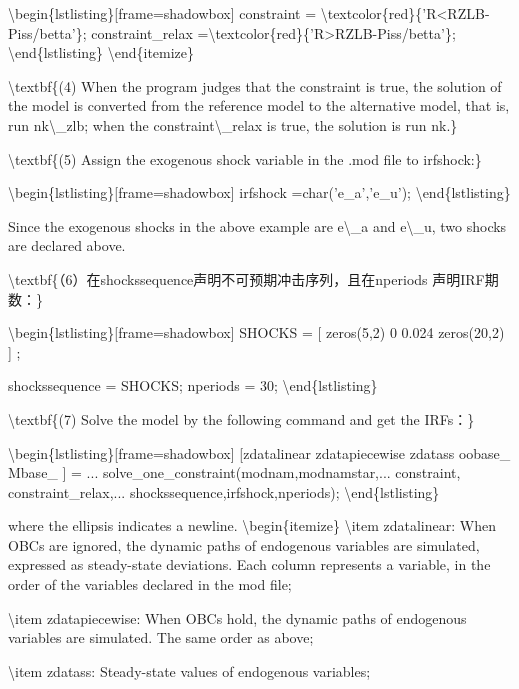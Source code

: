 \documentclass[10pt,math=newtx,citestyle=gb7714-2015,bibstyle=gb7714-2015]{elegantbook}
\begin{document}
	\textbackslash{}begin\{lstlisting\}[frame=shadowbox]
	constraint = \textbackslash{}textcolor\{red\}\{'R<RZLB-Piss/betta'\};
	constraint\_relax =\textbackslash{}textcolor\{red\}\{'R>RZLB-Piss/betta'\};
	\textbackslash{}end\{lstlisting\}
	\textbackslash{}end\{itemize\}
	
	\textbackslash{}textbf\{(4) When the program judges that the constraint is true, the solution of the model is converted from the reference model to the alternative model, that is, run nk\textbackslash{}\_zlb; when the constraint\textbackslash{}\_relax is true, the solution is run nk.\}
	
	\textbackslash{}textbf\{(5) Assign the exogenous shock variable in the .mod file to irfshock:\}
	
	\textbackslash{}begin\{lstlisting\}[frame=shadowbox]
	irfshock =char('e\_a','e\_u');
	\textbackslash{}end\{lstlisting\}
	
	Since the exogenous shocks in the above example are e\textbackslash{}\_a and e\textbackslash{}\_u, two shocks are declared above.
	
	\textbackslash{}textbf\{（6）在shockssequence声明不可预期冲击序列，且在nperiods 声明IRF期数：\}
	
	\textbackslash{}begin\{lstlisting\}[frame=shadowbox]
	SHOCKS = [ zeros(5,2)
	0  0.024
	zeros(20,2) ] ;
	
	
	shockssequence = SHOCKS;
	nperiods = 30;
	\textbackslash{}end\{lstlisting\}
	
	\textbackslash{}textbf\{(7) Solve the model by the following command and get the IRFs：\}
	
	\textbackslash{}begin\{lstlisting\}[frame=shadowbox]
	[zdatalinear zdatapiecewise zdatass oobase\_ Mbase\_  ] = ...
	solve\_one\_constraint(modnam,modnamstar,...
	constraint, constraint\_relax,...
	shockssequence,irfshock,nperiods);
	\textbackslash{}end\{lstlisting\}
	
	where  the ellipsis indicates a newline.
	\textbackslash{}begin\{itemize\}
	\textbackslash{}item zdatalinear: When OBCs are ignored, the dynamic paths of endogenous variables are simulated, expressed as steady-state deviations. Each column represents a variable, in the order of the variables declared in the mod file;
	
	\textbackslash{}item zdatapiecewise: When OBCs hold, the dynamic paths of endogenous variables are simulated. The same order as above;
	
	\textbackslash{}item zdatass: Steady-state values of endogenous variables;
	
\end{document}
